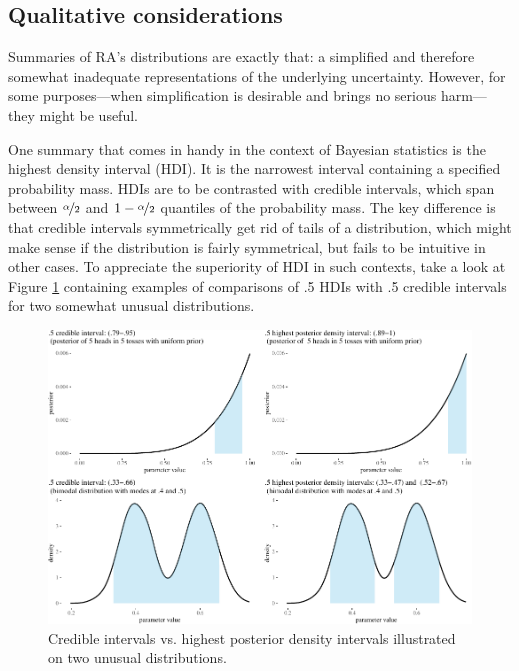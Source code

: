 \documentclass[
  10pt,
  dvipsnames,enabledeprecatedfontcommands]{scrartcl}
\begin{document}
\hypertarget{qualitative-considerations}{%
\subsection{Qualitative
considerations}\label{qualitative-considerations}}

Summaries of RA's distributions are exactly that: a simplified and
therefore somewhat inadequate representations of the underlying
uncertainty. However, for some purposes---when simplification is
desirable and brings no serious harm---they might be useful.

One summary that comes in handy in the context of Bayesian statistics is
the highest density interval (HDI). It is the narrowest interval
containing a specified probability mass. HDIs are to be contrasted with
credible intervals, which span between \(\nicefrac{\alpha}{2}\) and
\(1-\nicefrac{\alpha}{2}\) quantiles of the probability mass. The key
difference is that credible intervals symmetrically get rid of tails of
a distribution, which might make sense if the distribution is fairly
symmetrical, but fails to be intuitive in other cases. To appreciate the
superiority of HDI in such contexts, take a look at Figure
\ref{fig:HPDIs} containing examples of comparisons of .5 HDIs with .5
credible intervals for two somewhat unusual distributions.

\begin{figure}

\begin{center}\includegraphics[width=1\linewidth]{impreciseEpistemicFINAL_files/figure-latex/fig:HPDIplot-1} \end{center}
\caption{Credible intervals vs. highest posterior density intervals illustrated on two unusual distributions.}
\label{fig:HPDIs}
\end{figure}
\end{document}
